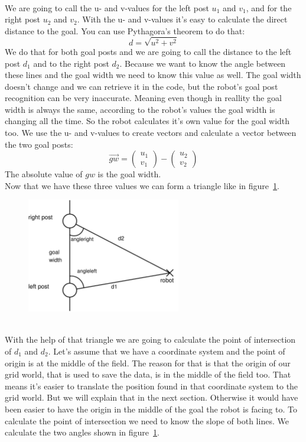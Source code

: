 \documentclass[lnicst,a4paper]{svmultln}
\begin{document}
\\
We are going to call the u- and v-values for the left post \(u_{1}\) and \(v_{1}\), and for the right post \(u_{2}\) and \(v_{2}\). With the u- and v-values it's easy to calculate the direct distance to the goal. You can use Pythagora's theorem to do that: 
\begin{equation}
	d = \sqrt{u^2+v^2}
\end{equation}
We do that for both goal posts and we are going to call the distance to the left post \(d_{1}\) and to the right post \(d_{2}\). Because we want to know the angle between these lines and the goal width we need to know this value as well. The goal width doesn't change and we can retrieve it in the code, but the robot's goal post recognition can be very inaccurate. Meaning even though in reallity the goal width is always the same, according to the robot's values the goal width is changing all the time. So the robot calculates it's own value for the goal width too. We use the u- and v-values to create vectors and calculate a vector between the two goal posts:
\begin{equation}
	\vec{gw}=\left(\begin{array}{c} u_{1} \\ v_{1} \end{array}\right) - \left(\begin{array}{c} u_{2} \\ v_{2} \end{array}\right)
\end{equation}
The absolute value of \(gw\) is the goal width.
\\
Now that we have these three values we can form a triangle like in figure~\ref{fig:triangle}.
\begin{figure}
 	\centerline{\includegraphics[width=0.6\textwidth]{triangle.pdf}}
	{\caption{}\label{fig:triangle}}
\end{figure}
\\
With the help of that triangle we are going to calculate the point of intersection of \(d_{1}\) and \(d_{2}\). Let's assume that we have a coordinate system and the point of origin is at the middle of the field. The reason for that is that the origin of our grid world, that is used to save the data, is in the middle of the field too. That means it's easier to translate the position found in that coordinate system to the grid world. But we will explain that in the next section. Otherwise it would have been easier to have the origin in the middle of the goal the robot is facing to. To calculate the point of intersection we need to know the slope of both lines. We calculate the two angles shown in figure~\ref{fig:triangle}.
\end{document}
